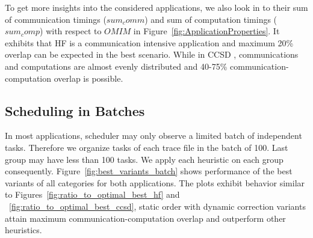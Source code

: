 \documentclass[sigconf]{acmart}
\begin{document}
{		
		
		
		To get more insights into the considered applications, we also look in to their sum of communication timings ($sum_comm$)  and sum of computation timings  ($sum_comp$) with respect to $OMIM$ in Figure~\ref{fig:ApplicationProperties}. It exhibits that HF is a communication intensive application and maximum 20\% overlap can be expected in the best scenario. While in CCSD , communications and computations are almost evenly distributed and 40-75\% communication-computation overlap is possible.
		
		
		
		
		\subsection{Scheduling in Batches}
		In most applications, scheduler may only observe a limited batch of independent tasks. Therefore we organize tasks of each trace file in the batch of 100. Last group may have less than 100 tasks. We apply each heuristic on each group consequently. Figure~\ref{fig:best_variants_batch} shows performance of the best variants of all categories for both applications. The plots exhibit behavior similar to Figures~\ref{fig:ratio_to_optimal_best_hf} and ~\ref{fig:ratio_to_optimal_best_ccsd}, static order with dynamic correction variants attain maximum communication-computation overlap and outperform other heuristics.
		
		
}
\end{document}
